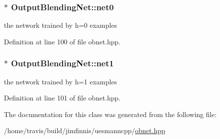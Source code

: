 \subsubsection[{\texorpdfstring{net0}{net0}}]{$\ast$ Output\+Blending\+Net\+::net0\hspace{0.3cm}{\ttfamily [protected]}}\hypertarget{classOutputBlendingNet_aa65fd4a6057be9228b1522305ab26b4f}{}\label{classOutputBlendingNet_aa65fd4a6057be9228b1522305ab26b4f}


the network trained by h=0 examples 



Definition at line 100 of file obnet.\+hpp.

\subsubsection[{\texorpdfstring{net1}{net1}}]{$\ast$ Output\+Blending\+Net\+::net1\hspace{0.3cm}{\ttfamily [protected]}}\hypertarget{classOutputBlendingNet_ac4c73caa5df06dbdb0046f0001b165b6}{}\label{classOutputBlendingNet_ac4c73caa5df06dbdb0046f0001b165b6}


the network trained by h=1 examples 



Definition at line 101 of file obnet.\+hpp.



The documentation for this class was generated from the following file\+:\begin{DoxyCompactItemize}
\item 
/home/travis/build/jimfinnis/uesmanncpp/\hyperlink{obnet_8hpp}{obnet.\+hpp}\end{DoxyCompactItemize}
